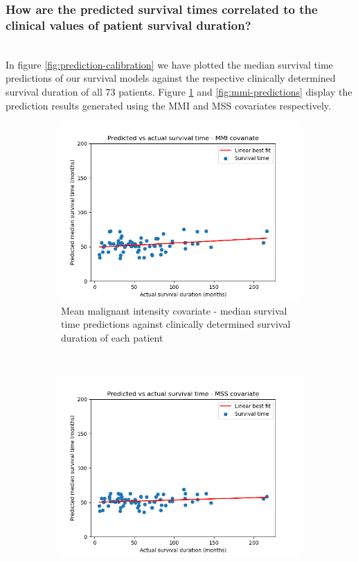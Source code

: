 \documentclass{l4proj}
\begin{document}
\subsubsection{How are the predicted survival times correlated to the clinical values of patient survival duration?}\hfill \\
In figure \ref{fig:prediction-calibration} we have plotted the median survival time predictions of our survival models against the respective clinically determined survival duration of all 73 patients. Figure \ref{fig:mss-predictions} and \ref{fig:mmi-predictions} display the prediction results generated using the MMI and MSS covariates respectively. 
\begin{figure}[h]
    \centering
    \begin{subfigure}[b]{0.4\textwidth}
        \includegraphics[scale=0.45]{images/pva-mmi.png}
        \caption{Mean malignant intensity covariate - median survival time predictions against clinically determined survival duration of each patient }
        \label{fig:mss-predictions}
    \end{subfigure}\hfill%
    ~
    \begin{subfigure}[b]{0.4\textwidth}
        \includegraphics[scale=0.45]{images/pva-mss.png}

\end{subfigure}
\end{figure}
\end{document}
